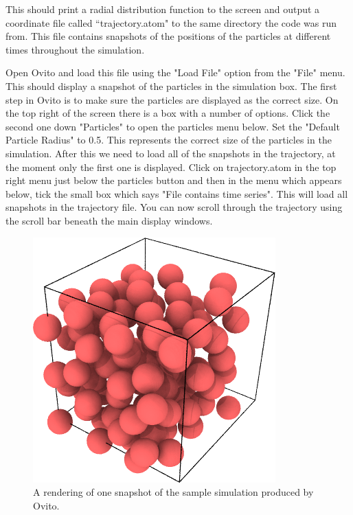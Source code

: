 This should print a radial distribution function to the screen and output a coordinate file called ``trajectory.atom" to the same directory the code was run from. This file contains snapshots of the positions of the particles at different times throughout the simulation. 

Open Ovito and load this file using the "Load File" option from the "File" menu. This should display a snapshot of the particles in the simulation box. The first step in Ovito is to make sure the particles are displayed as the correct size. On the top right of the screen there is a box with a number of options. Click the second one down "Particles" to open the particles menu below. Set the "Default Particle Radius" to 0.5. This represents the correct size of the particles in the simulation. After this we need to load all of the snapshots in the trajectory, at the moment only the first one is displayed. Click on trajectory.atom in the top right menu just below the particles button and then in the menu which appears below, tick the small box which says "File contains time series". This will load all snapshots in the trajectory file. You can now scroll through the trajectory using the scroll bar beneath the main display windows. 

	\begin{figure}[h]
		\centering
		\includegraphics[scale=0.6]{images/example_render}
		\caption{A rendering of one snapshot of the sample simulation produced by Ovito.}
		\label{fig:ovitosample}
	\end{figure}